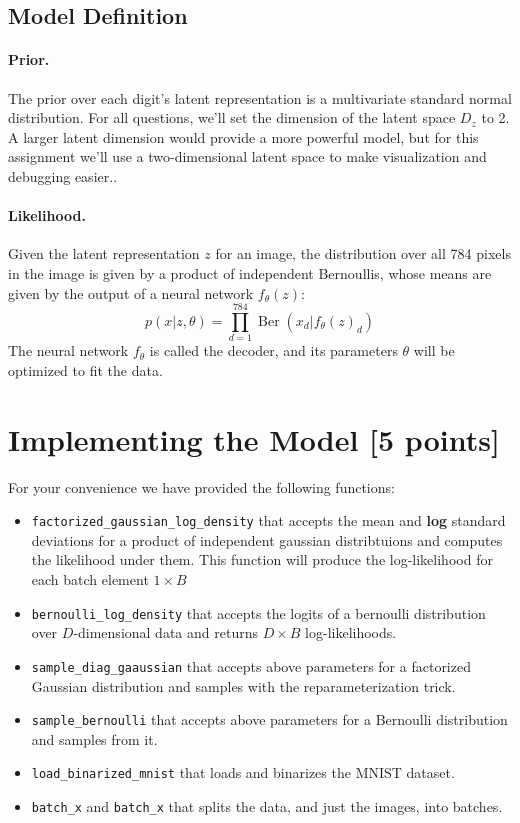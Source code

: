 \documentclass{article}
\begin{document}
\subsection{Model Definition}

\paragraph{Prior.}
The prior over each digit's latent representation is a multivariate standard normal distribution.
For all questions, we'll set the dimension of the latent space $D_z$ to 2.
A larger latent dimension would provide a more powerful model, but for this assignment we'll use a two-dimensional latent space to make visualization and debugging easier..


\paragraph{Likelihood.}
Given the latent representation $z$ for an image, the distribution over all 784 pixels in the image is given by a product of independent Bernoullis, whose means are given by the output of a neural network $f_\theta(z)$:
$$p(x|z, \theta) = \prod_{d=1}^{784} \operatorname{Ber}(x_d|f_\theta(z)_d)$$
The neural network $f_\theta$ is called the decoder, and its parameters $\theta$ will be optimized to fit the data.


\pagebreak
\section{Implementing the Model [5 points]}

For your convenience we have provided the following functions:
\begin{itemize}
  \item \texttt{factorized\_gaussian\_log\_density} that accepts the mean and \textbf{log} standard deviations for a product of independent gaussian distribtuions and computes the likelihood under them. This function will produce the log-likelihood for each batch element $1 \times B$
  \item \texttt{bernoulli\_log\_density} that accepts the logits of a bernoulli distribution over $D$-dimensional data and returns $D \times B$ log-likelihoods.
  \item \texttt{sample\_diag\_gaaussian} that accepts above parameters for a factorized Gaussian distribution and samples with the reparameterization trick.
  \item \texttt{sample\_bernoulli} that accepts above parameters for a Bernoulli distribution and samples from it.
  \item \texttt{load\_binarized\_mnist} that loads and binarizes the MNIST dataset.
  \item \texttt{batch\_x} and \texttt{batch\_x} that splits the data, and just the images, into batches.
\end{itemize}
\end{document}
